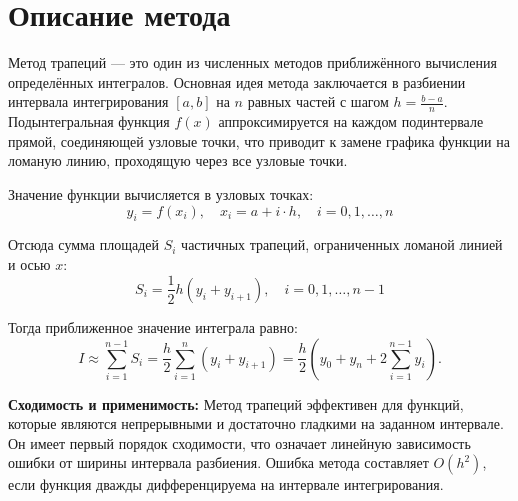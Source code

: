 \section{Описание метода}

Метод трапеций — это один из численных методов приближённого вычисления определённых интегралов. Основная идея метода заключается в разбиении интервала интегрирования \([a, b]\) на \(n\) равных частей с шагом \(h=\frac{b-a}{n}\). Подынтегральная функция \(f(x)\) аппроксимируется на каждом подинтервале прямой, соединяющей узловые точки, что приводит к замене графика функции на ломаную линию, проходящую через все узловые точки.

Значение функции вычисляется в узловых точках:
\[
y_i = f(x_i), \quad x_i = a + i \cdot h, \quad i = 0, 1, \ldots, n
\]

Отсюда сумма площадей \(S_i\) частичных трапеций, ограниченных ломаной линией и осью \(x\):
\[
S_i = \frac{1}{2}h(y_i + y_{i+1}), \quad i = 0, 1, \ldots, n-1
\]

Тогда приближенное значение интеграла равно:
\[
I \approx \sum \limits_{i=1}^{n-1}S_i = \frac{h}{2} \sum \limits_{i=1}^{n}(y_i + y_{i+1}) = \frac{h}{2}(y_0 + y_n + 2\sum \limits_{i=1}^{n-1}y_i).
\]

\textbf{Сходимость и применимость:} Метод трапеций эффективен для функций, которые являются непрерывными и достаточно гладкими на заданном интервале. Он имеет первый порядок сходимости, что означает линейную зависимость ошибки от ширины интервала разбиения. Ошибка метода составляет \(O(h^2)\), если функция дважды дифференцируема на интервале интегрирования.

